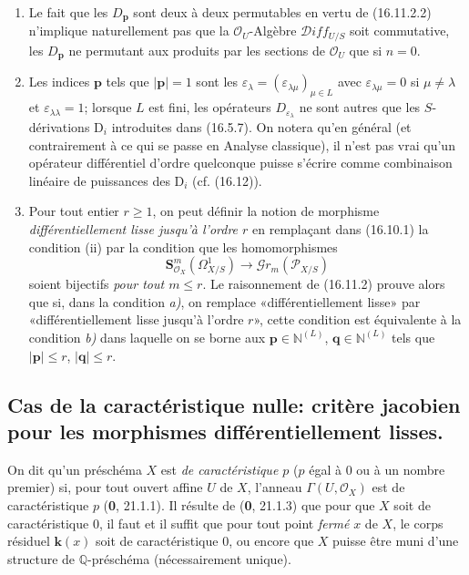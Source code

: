 \begin{remarks}[16.11.3]
\begin{enumerate}
  \item[(i)] Le fait que les $D_{\mathbf{p}}$ sont deux à deux permutables en
  vertu de (16.11.2.2) n'implique naturellement pas que la
  $\mathcal{O}_U$-Algèbre $\mathscr{D}\!iff_{U/S}$ soit commutative, les
  $D_{\mathbf{p}}$ ne permutant aux produits par les sections de
  $\mathcal{O}_U$ que si $n=0$.
  \item[(ii)] Les indices $\mathbf{p}$ tels que $|\mathbf{p}|=1$ sont les
  $\varepsilon_\lambda
  =(\varepsilon_{\lambda\mu})_{\mu\in L}$ avec
  $\varepsilon_{\lambda\mu}=0$ si $\mu\neq\lambda$ et
  $\varepsilon_{\lambda\lambda}=1$; lorsque $L$ est fini, les opérateurs
  $D_{\varepsilon_\lambda}$ ne sont autres que les
  $S$-dérivations $\mathrm{D}_i$ introduites dans (16.5.7). On notera qu'en général
  (et contrairement à ce qui se passe en Analyse classique), il n'est pas
  vrai qu'un opérateur différentiel d'ordre quelconque puisse s'écrire comme
  combinaison linéaire de puissances des $\mathrm{D}_i$ (cf. (16.12)).
  \item[(iii)] Pour tout entier $r\geq1$, on peut définir la notion de
  morphisme \emph{différentiellement lisse jusqu'à l'ordre $r$} en remplaçant
  dans (16.10.1) la condition (ii) par la condition que les homomorphismes
  \[
    \mathbf{S}_{\mathcal{O}_X}^m(\varOmega_{X/S}^1)
    \longrightarrow\mathscr{G}r_m(\mathscr{P}_{X/S})
  \]
  soient bijectifs \emph{pour tout $m\leq r$}. Le raisonnement de (16.11.2)
  prouve alors que si, dans la condition \emph{a)}, on remplace «différentiellement
  lisse» par «différentiellement lisse jusqu'à l'ordre $r$», cette condition
  est équivalente à la condition \emph{b)} dans laquelle on se borne aux
  $\mathbf{p}\in\mathbb{N}^{(L)}$, $\mathbf{q}\in\mathbb{N}^{(L)}$ tels que
  $|\mathbf{p}|\leq r$, $|\mathbf{q}|\leq r$.
\end{enumerate}
\end{remarks}

\subsection{Cas de la caractéristique nulle: critère jacobien pour les
morphismes différentiellement lisses.}

\begin{env}[16.12.1]
On dit qu'un préschéma $X$ est \emph{de caractéristique $p$} ($p$ égal à $0$
ou à un nombre premier) si, pour tout ouvert affine $U$ de $X$, l'anneau
$\Gamma(U,\mathcal{O}_X)$ est de caractéristique $p$ (\textbf{0}, 21.1.1). Il résulte
de (\textbf{0}, 21.1.3) que pour que $X$ soit de caractéristique $0$, il faut et il
suffit que pour tout point \emph{fermé} $x$ de $X$, le corps résiduel $\boldsymbol{k}(x)$
soit de caractéristique $0$, ou encore que $X$ puisse être muni d'une
structure de $\mathbb{Q}$-préschéma (nécessairement unique).
\end{env}

